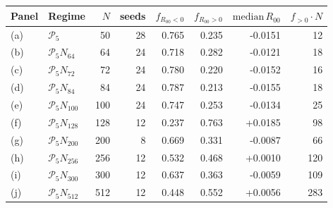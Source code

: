 \begin{tabular}{l l r r r r r r}
\toprule
Panel & Regime & $N$ & seeds & $f_{R_{00}<0}$ & $f_{R_{00}>0}$ & $\mathrm{median}\,R_{00}$ & $f_{>0}\cdot N$ \\
\midrule
(a) & $\mathcal{P}_{5}$ & 50 & 28 & 0.765 & 0.235 & -0.0151 & 12 \\
(b) & $\mathcal{P}_{5}N_{64}$ & 64 & 24 & 0.718 & 0.282 & -0.0121 & 18 \\
(c) & $\mathcal{P}_{5}N_{72}$ & 72 & 24 & 0.780 & 0.220 & -0.0152 & 16 \\
(d) & $\mathcal{P}_{5}N_{84}$ & 84 & 24 & 0.787 & 0.213 & -0.0155 & 18 \\
(e) & $\mathcal{P}_{5}N_{100}$ & 100 & 24 & 0.747 & 0.253 & -0.0134 & 25 \\
(f) & $\mathcal{P}_{5}N_{128}$ & 128 & 12 & 0.237 & 0.763 & +0.0185 & 98 \\
(g) & $\mathcal{P}_{5}N_{200}$ & 200 & 8 & 0.669 & 0.331 & -0.0087 & 66 \\
(h) & $\mathcal{P}_{5}N_{256}$ & 256 & 12 & 0.532 & 0.468 & +0.0010 & 120 \\
(i) & $\mathcal{P}_{5}N_{300}$ & 300 & 12 & 0.637 & 0.363 & -0.0059 & 109 \\
(j) & $\mathcal{P}_{5}N_{512}$ & 512 & 12 & 0.448 & 0.552 & +0.0056 & 283 \\
\bottomrule
\end{tabular}